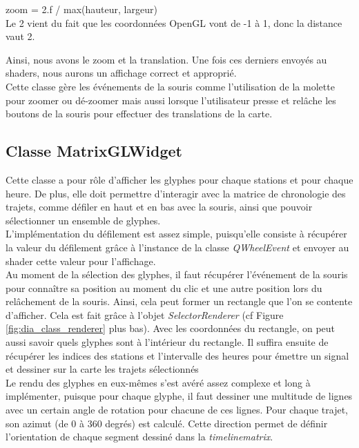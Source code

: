 \documentclass[12pt]{article}
\begin{document}
	zoom = 2.f / max(hauteur, largeur)\\

	Le 2 vient du fait que les coordonnées OpenGL vont de -1 à 1, donc la distance vaut 2.

	Ainsi, nous avons le zoom et la translation. Une fois ces derniers envoyés au shaders, nous aurons un affichage correct et approprié.\\

	Cette classe gère les événements de la souris comme l’utilisation de la molette pour zoomer ou dé-zoomer mais aussi lorsque l’utilisateur presse et relâche les boutons de la souris pour effectuer des translations de la carte.
		
		\subsection{Classe MatrixGLWidget}		
		Cette classe a pour rôle d’afficher les glyphes pour chaque stations et pour chaque heure. De plus, elle doit permettre d’interagir avec la matrice de chronologie des trajets, comme défiler en
		haut et en bas avec la souris, ainsi que pouvoir sélectionner un ensemble de glyphes.\\

		L'implémentation du défilement est assez simple, puisqu'elle consiste à récupérer la valeur
		du défilement grâce à l'instance de la classe \textit{QWheelEvent} et envoyer au shader cette valeur pour l’affichage.\\

		Au moment de la sélection des glyphes, il faut récupérer l'événement de la souris pour connaître sa position au moment du clic et une autre position lors du relâchement de la souris. Ainsi, cela peut former un rectangle que l’on se contente d’afficher. Cela est fait grâce à l’objet \textit{SelectorRenderer} (cf Figure \ref{fig:dia_class_renderer} plus bas). Avec les coordonnées du rectangle, on peut aussi savoir quels glyphes sont à l'intérieur du rectangle. Il suffira ensuite de récupérer les indices des stations et l’intervalle des heures pour émettre un signal et dessiner sur la carte les trajets sélectionnés\\

		Le rendu des glyphes en eux-mêmes s’est avéré assez complexe et long à implémenter, puisque pour chaque glyphe, il faut dessiner une multitude de lignes avec un certain angle de rotation pour chacune de ces lignes. Pour chaque trajet, son azimut (de 0 à 360 degrés) est calculé. Cette direction permet de définir l'orientation de chaque segment dessiné dans la \textit{timelinematrix}.
		
\end{document}
